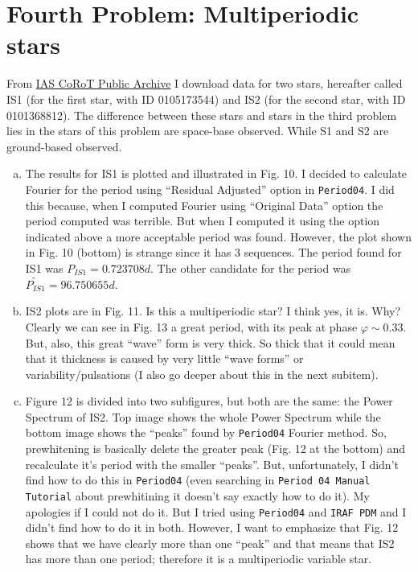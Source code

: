 \section{Fourth Problem: Multiperiodic stars}

From \href{http://idoc-corot.ias.u-psud.fr/}{IAS CoRoT Public Archive} I download data for two stars, hereafter called IS1 (for the first star, with ID 0105173544) and IS2 (for the second star, with ID 0101368812). The difference between these stars and stars in the third problem lies in the stars of this problem are space-base observed. While S1 and S2 are ground-based observed.

\begin{enumerate} [a)]
\item The results for IS1 is plotted and illustrated in Fig. 10. I decided to calculate Fourier for the period using ``Residual Adjusted'' option in \texttt{Period04}. I did this because, when I computed Fourier using ``Original Data'' option the period computed was terrible. But when I computed it using the option indicated above a more acceptable period was found. However, the plot shown in Fig. 10 (bottom) is strange since it has 3 sequences. The period found for IS1 was $P_{IS1} = 0.723708 d$. The other candidate for the period was $\tilde{P_{IS1}} = 96.750655 d$.


\item IS2 plots are in Fig. 11. Is this a multiperiodic star? I think yes, it is. Why? Clearly we can see in Fig. 13 a great period, with its peak at phase $\varphi \sim 0.33  $. But, also, this great ``wave'' form is very thick. So thick that it could mean that it thickness is caused by very little ``wave forms'' or variability/pulsations (I also go deeper about this in the next subitem).

\item Figure 12 is divided into two subfigures, but both are the same: the Power Spectrum of IS2. Top image shows the whole Power Spectrum while the bottom image shows the ``peaks'' found by \texttt{Period04} Fourier method. So, prewhitening is basically delete the greater peak (Fig. 12 at the bottom) and recalculate it's period with the smaller ``peaks''. But, unfortunately, I didn't find how to do this in \texttt{Period04} (even searching in \texttt{Period 04 Manual Tutorial} about prewhitining it doesn't say exactly how to do it). My apologies if I could not do it. But I tried using \texttt{Period04} and \texttt{IRAF PDM} and I didn't find how to do it in both. However, I want to emphasize that Fig. 12 shows that we have clearly more than one ``peak'' and that means that IS2 has more than one period; therefore it is a multiperiodic variable star.


\end{enumerate}
